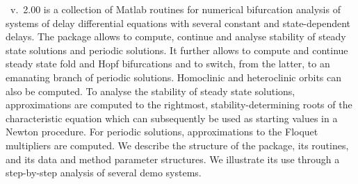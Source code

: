{\DDEBIFCODE\ v.~2.00} is a collection of Matlab routines for numerical 
bifurcation
analysis of systems of delay differential equations with several constant
and state-dependent delays. The package allows to compute, 
continue and analyse stability of
steady state solutions and periodic solutions. 
It further allows to compute and
continue steady state fold and Hopf bifurcations and
to switch, from the latter, to an emanating branch of periodic
solutions.  Homoclinic and heteroclinic orbits can also be computed.
To analyse the stability of steady state solutions, 
approximations are computed to
the rightmost, stability-determining roots of the characteristic
equation which can sub\-sequently be used as starting values in a Newton
procedure.
For periodic solutions, approximations to the Floquet multipliers
are computed.
We describe the structure of the package, its routines,
and its data and method parameter structures.
We illustrate its use through a step-by-step analysis of several
demo systems.
 
